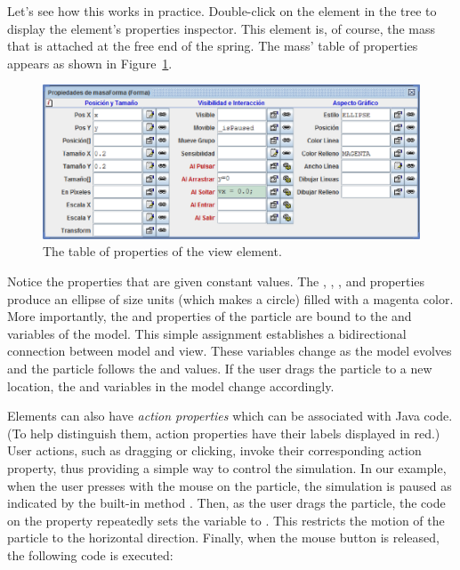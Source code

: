 Let's see how this works in practice. Double-click on the  element in the tree to display the element's properties inspector. This element is, of course, the mass that is attached at the free end of the spring. The mass' table of properties appears as shown in Figure~\ref{fig:02EjsIntro/SpringBallProperties}.
\begin{figure}[htb]
    \centering
  \includegraphics[scale=\scale]{02EjsIntro/images/SpringBallProperties.eps}
    \caption{The table of properties of the  view element. }
    \label{fig:02EjsIntro/SpringBallProperties}
\end{figure}

Notice the properties that are given constant values. The , , , and  properties produce an ellipse of size  units (which makes a circle) filled with a magenta color. More importantly, the  and  properties of  the particle are bound to the  and  variables of the model. This simple assignment establishes a bidirectional connection between model and view. These variables change as the model evolves and the particle follows the  and  values. If the user drags the particle to a new location, the  and  variables in the model change accordingly.

Elements can also have \emph{action properties} which can be associated with Java code. (To help distinguish them, action properties have their labels displayed in red.) User actions, such as dragging or clicking, invoke their corresponding action property, thus providing a simple way to control the simulation. In our example, when the user presses with the mouse on the particle, the simulation is paused as indicated by the built-in method . Then, as the user drags the particle, the code on the  property repeatedly sets the  variable to . This restricts the motion of the particle to the horizontal direction. Finally, when the mouse button is released, the following code is executed:

